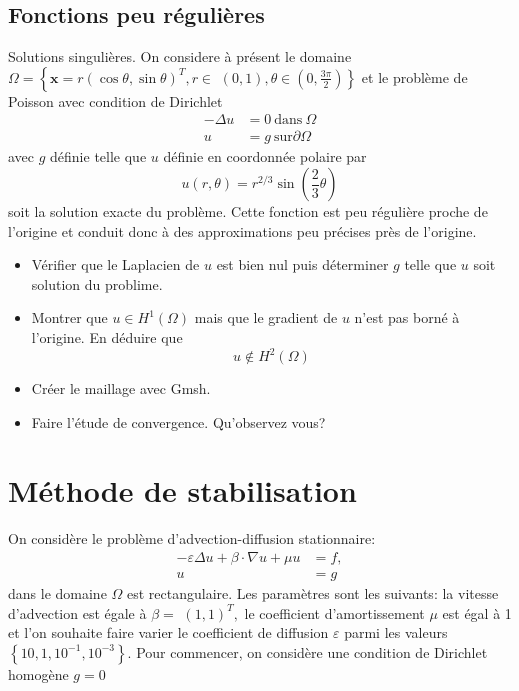 \documentclass[11pt,utf8]{article}
\begin{document}
\subsection{Fonctions peu régulières}
\label{sec:fonct-peu-regul}

Solutions singulières. On considere à présent le domaine $\Omega=\left\{\mathbf{x}=r(\cos \theta, \sin \theta)^{T}, r \in\right.$ $\left.(0,1), \theta \in\left(0, \frac{3 \pi}{2}\right)\right\}$ et le problème de Poisson avec condition de Dirichlet
  \begin{equation}
  \label{eq:1}
  \begin{split}
    -\Delta u &= 0\ \mbox{dans}\ \Omega\\
    u &= g\ \mbox{sur} \partial\Omega
  \end{split}
\end{equation}
avec $g$ définie telle que $u$ définie en coordonnée polaire par
$$
u(r, \theta)=r^{2 / 3} \sin \left(\frac{2}{3} \theta\right)
$$
soit la solution exacte du problème. Cette fonction est peu régulière proche de l'origine et conduit donc à des approximations peu précises près de l'origine.
\begin{itemize}
\item Vérifier que le Laplacien de $u$ est bien nul puis déterminer $g$ telle que $u$ soit solution du problime.
\item Montrer que $u \in H^{1}(\Omega)$ mais que le gradient de $u$ n'est pas borné à l'origine. En déduire que
$$
u \notin H^{2}(\Omega)
$$
\item  Créer le maillage avec Gmsh.
\item Faire l'étude de convergence. Qu'observez vous?
\end{itemize}

\section{Méthode de stabilisation}

On considère le problème d'advection-diffusion stationnaire:
$$
\begin{aligned}
-\varepsilon \Delta u+\beta \cdot \nabla u+\mu u &=f, \\
u &=g
\end{aligned}
$$
dans le domaine $\Omega$ est rectangulaire. 
Les paramètres sont les suivants: la vitesse d'advection est égale à $\beta=$ $(1,1)^{T},$ le coefficient d'amortissement $\mu$ est égal à 1 et l'on souhaite faire varier le coefficient de diffusion $\varepsilon$ parmi les valeurs $\left\{10,1,10^{-1}, 10^{-3}\right\} .$ 
Pour commencer, on considère une condition de Dirichlet homogène $g=0$
\end{document}
